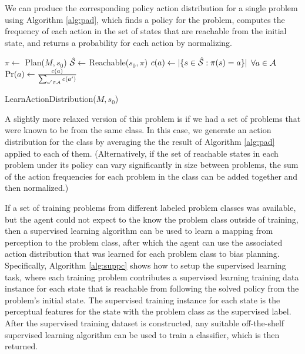 \documentclass{article}
\begin{document}
We can produce the corresponding policy action distribution for a single problem using Algorithm \ref{alg:pad}, which finds a policy for the problem, computes the frequency of each action in the set of
states that are reachable from the initial state, and returns a probability
for each action by normalizing.
\begin{algorithm}
\begin{algorithmic}
\State $\pi \gets$ Plan($M, s_0$)
\State $\hat{\cal S} \gets$ Reachable($s_0, \pi$) 
\State $c(a) \gets |\{ s \in \hat{\cal S} : \pi(s) = a \}|$  $\forall a \in {\cal A}$ 
\State $\Pr(a) \gets \frac{c(a)}{\sum_{a' \in {\cal A}} c(a')}$
\State {}
\end{algorithmic}
\caption{LearnActionDistribution($M, s_0$)}
\label{alg:pad}
\end{algorithm}

A slightly more relaxed version of this problem is if we had a set of problems that were known to be from the same class. In this case, we generate an action distribution for the class by averaging the the result of Algorithm \ref{alg:pad} applied to each of them. (Alternatively, if the set of reachable states in each problem under its policy can vary significantly in size between problems, the sum of the action frequencies for each problem in the class can be added together and then normalized.)

If a set of training problems from different labeled problem classes was available, but the agent could not expect to the know the problem class outside of training, then a supervised learning algorithm can be used to learn a mapping from perception to the problem class, after which the agent can use the associated action distribution that was learned for each problem class to bias planning. Specifically, Algorithm \ref{alg:suppc} shows how to setup the supervised learning task, where each training problem contributes a supervised
learning training data instance for each state that is reachable from following
the solved policy from the problem's initial state. The supervised training
instance for each state is the perceptual features for the state with the problem class as the supervised label. After the supervised training dataset is constructed, any suitable off-the-shelf supervised learning algorithm can be used to train a classifier, which is then returned.
\end{document}
